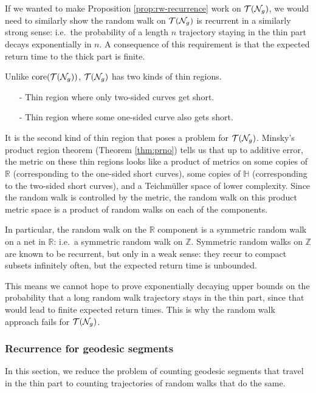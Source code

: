 If we wanted to make Proposition \ref{prop:rw-recurrence} work on $\mathcal{T}(\mathcal{N}_g)$, we would need to similarly show the random walk on $\mathcal{T}(\mathcal{N}_g)$ is recurrent in a similarly strong sense: i.e.\ the probability of a length $n$ trajectory staying in the thin part decays exponentially in $n$.
A consequence of this requirement is that the expected return time to the thick part is finite.

Unlike $\mathrm{core}(\mathcal{T}(\mathcal{N}_g))$, $\mathcal{T}(\mathcal{N}_g)$ has two kinds of thin regions.
\begin{itemize}
\item[-] Thin region where only two-sided curves get short.
\item[-] Thin region where some one-sided curve also gets short.
\end{itemize}

It is the second kind of thin region that poses a problem for $\mathcal{T}(\mathcal{N}_g)$.
Minsky's product region theorem (Theorem \ref{thm:prno}) tells us that up to additive error, the metric on these thin regions looks like a product of metrics on some copies of $\mathbb{R}$ (corresponding to the one-sided short curves), some copies of $\mathbb{H}$ (corresponding to the two-sided short curves), and a Teichmüller space of lower complexity.
Since the random walk is controlled by the metric, the random walk on this product metric space is a product of random walks on each of the components.

In particular, the random walk on the $\mathbb{R}$ component is a symmetric random walk on a net in $\mathbb{R}$: i.e.\ a symmetric random walk on $\mathbb{Z}$.
Symmetric random walks on $\mathbb{Z}$ are known to be recurrent, but only in a weak sense: they recur to compact subsets infinitely often, but the expected return time is unbounded.

This means we cannot hope to prove exponentially decaying upper bounds on the probability that a long random walk trajectory stays in the thin part, since that would lead to finite expected return times.
This is why the random walk approach fails for $\mathcal{T}(\mathcal{N}_g)$.

\subsubsection{Recurrence for geodesic segments}
\label{sec:recurr-geod-segm}

In this section, we reduce the problem of counting geodesic segments that travel in the thin part to counting trajectories of random walks that do the same.

